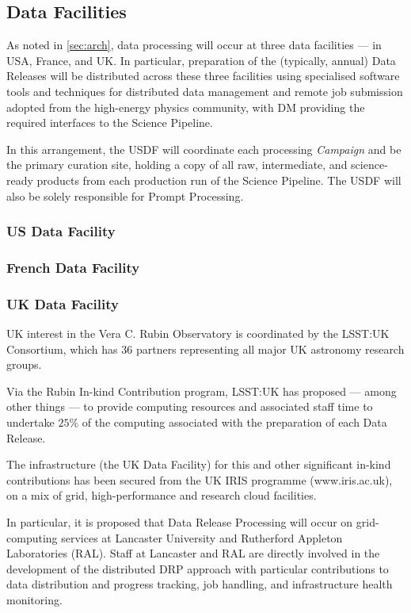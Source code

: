 \subsection{Data Facilities} \label{sec:datafacilities}

As noted in \autoref{sec:arch}, data processing will occur at three data facilities --- in USA, France, and UK. In particular, preparation of the (typically, annual) Data Releases will be distributed across these three facilities using specialised software tools and techniques for distributed data management and remote job submission adopted from the high-energy physics community, with DM providing the required interfaces to the Science Pipeline.

In this arrangement, the USDF will coordinate each processing {\em Campaign} and be the primary curation site, holding a copy of all raw, intermediate, and science-ready products from each production run of the Science Pipeline. The USDF will also be solely responsible for Prompt Processing.

\subsubsection{US Data Facility} \label{sec:usdf}

\subsubsection{French Data Facility} \label{sec:frdf}

\subsubsection{UK Data Facility} \label{sec:ukdf}

UK interest in the Vera C. Rubin Observatory is coordinated by the LSST:UK Consortium, which has 36 partners representing all major UK astronomy research groups.

Via the Rubin In-kind Contribution program, LSST:UK has proposed --- among other things --- to provide computing resources and associated staff time to undertake $25\%$ of the computing associated with the preparation of each Data Release.

The infrastructure (the UK Data Facility) for this and other significant in-kind contributions has been secured from the UK IRIS programme (www.iris.ac.uk), on a mix of grid, high-performance and research cloud facilities.

In particular, it is proposed that Data Release Processing will occur on grid-computing services at Lancaster University and Rutherford Appleton Laboratories (RAL). Staff at Lancaster and RAL are directly involved in the development of the distributed DRP approach with particular contributions to data distribution and progress tracking, job handling, and infrastructure health monitoring.

